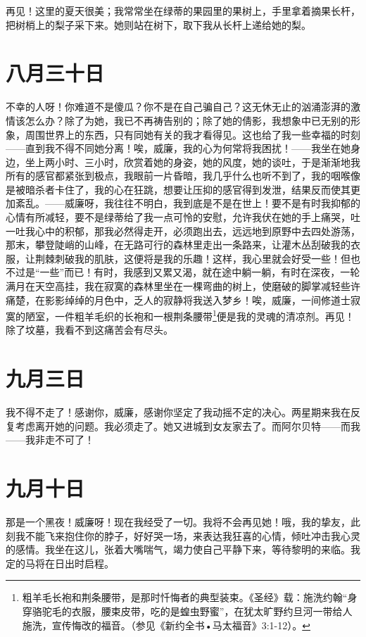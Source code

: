 \documentclass[12pt,oneside]{book}
\begin{document}
再见！这里的夏天很美；我常常坐在绿蒂的果园里的果树上，手里拿着摘果长杆，把树梢上的梨子采下来。她则站在树下，取下我从长杆上递给她的梨。
　　

\chapter{八月三十日}
\label{sec-2-38}
不幸的人呀！你难道不是傻瓜？你不是在自己骗自己？这无休无止的汹涌澎湃的激情该怎么办？除了为她，我已不再祷告别的；除了她的倩影，我想象中已无别的形象，周围世界上的东西，只有同她有关的我才看得见。这也给了我一些幸福的时刻——直到我不得不同她分离！唉，威廉，我的心为何常将我困扰！——我坐在她身边，坐上两小时、三小时，欣赏着她的身姿，她的风度，她的谈吐，于是渐渐地我所有的感官都紧张到极点，我眼前一片昏暗，我几乎什么也听不到了，我的咽喉像是被暗杀者卡住了，我的心在狂跳，想要让压抑的感官得到发泄，结果反而使其更加紊乱。——威廉呀，我往往不明白，我到底是不是在世上！要不是有时我抑郁的心情有所减轻，要不是绿蒂给了我一点可怜的安慰，允许我伏在她的手上痛哭，吐一吐我心中的积郁，那我必然得走开，必须跑出去，远远地到原野中去四处游荡，那末，攀登陡峭的山峰，在无路可行的森林里走出一条路来，让灌木丛刮破我的衣服，让荆棘刺破我的肌肤，这便将是我的乐趣！这样，我心里就会好受一些！但也不过是“一些”而已！有时，我感到又累又渴，就在途中躺一躺，有时在深夜，一轮满月在天空高挂，我在寂寞的森林里坐在一棵弯曲的树上，使磨破的脚掌减轻些许痛楚，在影影绰绰的月色中，乏人的寂静将我送入梦乡！唉，威廉，一间修道士寂寞的陋室，一件粗羊毛织的长袍和一根荆条腰带\footnote{粗羊毛长袍和荆条腰带，是那时忏悔者的典型装束。《圣经》载：施洗约翰“身穿骆驼毛的衣服，腰束皮带，吃的是蝗虫野蜜”，在犹太旷野约旦河一带给人施洗，宣传悔改的福音。（参见《新约全书•马太福音》3:1-12）。}便是我的灵魂的清凉剂。再见！除了坟墓，我看不到这痛苦会有尽头。


\chapter{九月三日}
\label{sec-2-39}
我不得不走了！感谢你，威廉，感谢你坚定了我动摇不定的决心。两星期来我在反复考虑离开她的问题。我必须走了。她又进城到女友家去了。而阿尔贝特——而我——我非走不可了！


\chapter{九月十日}
\label{sec-2-40}
那是一个黑夜！威廉呀！现在我经受了一切。我将不会再见她！哦，我的挚友，此刻我不能飞来抱住你的脖子，好好哭一场，来表达我狂喜的心情，倾吐冲击我心灵的感情。我坐在这儿，张着大嘴喘气，竭力使自己平静下来，等待黎明的来临。我定的马将在日出时启程。
\end{document}
